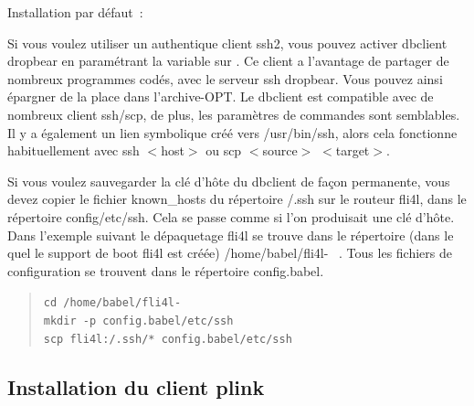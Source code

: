 \begin{description}


  Installation par défaut~: 

  Si vous voulez utiliser un authentique client ssh2, vous pouvez activer dbclient
  dropbear en paramétrant la variable sur . Ce client
  a l'avantage de partager de nombreux programmes codés, avec le serveur ssh
  dropbear. Vous pouvez ainsi épargner de la place dans l'archive-OPT. Le dbclient est
  compatible avec de nombreux client ssh/scp, de plus, les paramètres de commandes
  sont semblables. Il y a également un lien symbolique créé vers /usr/bin/ssh, alors
  cela fonctionne habituellement avec ssh $<$host$>$ ou scp $<$source$>$ $<$target$>$.

  Si vous voulez sauvegarder la clé d'hôte du dbclient de façon permanente,
  vous devez copier le fichier known\_hosts du répertoire /.ssh sur le
  routeur fli4l, dans le répertoire config/etc/ssh. Cela se passe comme
  si l'on produisait une clé d'hôte. Dans l'exemple suivant le dépaquetage fli4l
  se trouve dans le répertoire (dans le quel le support de boot fli4l est créée)
  /home/babel/fli4l-\version~ . Tous les fichiers de configuration se trouvent
  dans le répertoire config.babel.

\begin{example}
\begin{verse}
\texttt{cd /home/babel/fli4l-\version}\\
\texttt{mkdir -p config.babel/etc/ssh}\\
\texttt{scp fli4l:/.ssh/* config.babel/etc/ssh}
\end{verse}
\end{example}

\end{description}

\subsection {Installation du client plink}

